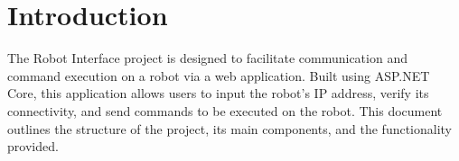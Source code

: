 \section{Introduction}
The Robot Interface project is designed to facilitate communication and command execution on a robot via a web application. Built using ASP.NET Core, this application allows users to input the robot's IP address, verify its connectivity, and send commands to be executed on the robot. This document outlines the structure of the project, its main components, and the functionality provided.
